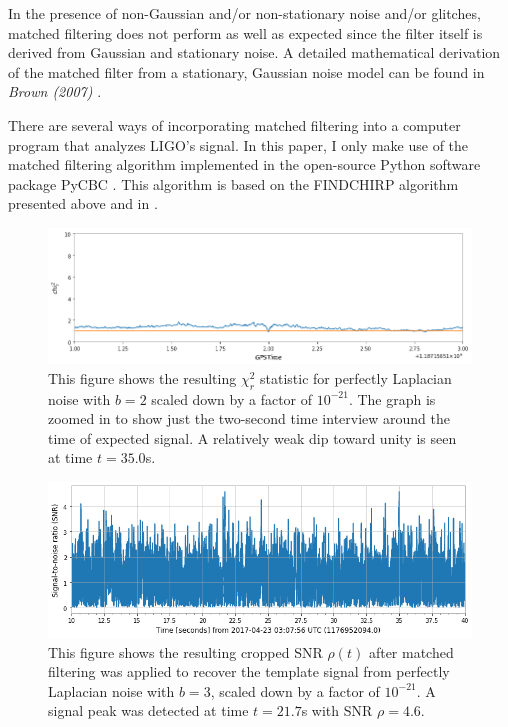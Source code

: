 \documentclass[preprint,
letterpaper,
 amsmath,amssymb,
 aps,
]{revtex4-2}
\begin{document}
In the presence of non-Gaussian and/or non-stationary noise and/or glitches, matched filtering does not perform as well as expected since the filter itself is derived from Gaussian and stationary noise. A detailed mathematical derivation of the matched filter from a stationary, Gaussian noise model can be found in \textit{Brown (2007)} \cite{brown2007searching}.


There are several ways of incorporating matched filtering into a computer program that analyzes LIGO's signal. In this paper, I only make use of the matched filtering algorithm implemented in the open-source Python software package PyCBC \cite{pycbc}. This algorithm is based on the FINDCHIRP algorithm presented above and in \cite{findchirp}.
\begin{widetext}
\begin{figure}[t]
\includegraphics[width = .9\textwidth]{chi2 laplace b=2.png}
\caption{This figure shows the resulting $\chi^2_r$ statistic for perfectly Laplacian noise with $b=2$ scaled down by a factor of $10^{-21}$. The graph is zoomed in to show just the two-second time interview around the time of expected signal. A relatively weak dip toward unity is seen at time $t = 35.0$s.}
\centering
\end{figure} 

\begin{figure}[t]
\includegraphics[width = .9\textwidth]{laplacian b=3 template 1.png}
\caption{This figure shows the resulting cropped SNR $\rho(t)$ after matched filtering was applied to recover the template signal from perfectly Laplacian noise with $b=3$, scaled down by a factor of $10^{-21}$. A signal peak was detected at time $t = 21.7$s with SNR $\rho = 4.6$.}
\centering
\end{figure}
\end{widetext}
\end{document}
